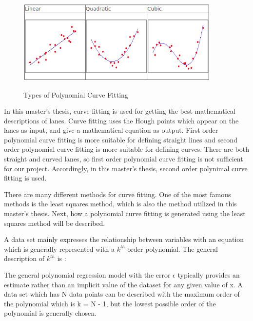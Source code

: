 \begin{figure}[H]
 \centering
  \includegraphics[width=0.9\textwidth]{./Bilder/Curve_Fitting_Polynomial.png}\label{Curve_Fitting_Polynomial}
  \caption{Types of Polynomial Curve Fitting\cite{Curve_Fitting_Polynomial}}
\end{figure}


In this master's thesis, curve fitting is used for getting the best mathematical descriptions of lanes. Curve fitting uses the Hough points which appear on the lanes as input, and give a mathematical equation as output. First order polynomial curve fitting is more suitable for defining straight lines and second order polynomial curve fitting is more suitable for defining curves. There are both straight and curved lanes, so first order polynomial curve fitting is not sufficient for our project. Accordingly, in this master's thesis, second order polynimal curve fitting is used.

There are many different methods for curve fitting. One of the most famous methods is the least squares method, which is also the method utilized in this master's thesis. Next, how a polynomial curve fitting is generated using the least squares method will be described.

A data set mainly expresses the relationship between variables with an equation which is generally represented with a $k^{th}$ order polynomial. The general description of $ k^{th} $ is :

\begin{center}
\end{center}

The general polynomial regression model with the error $\epsilon$ typically provides an estimate rather than an implicit value of the dataset for any given value of x. A data set which has N data points can be described with the maximum order of the polynomial which is k = N - 1, but the lowest possible order of the polynomial is generally chosen.

